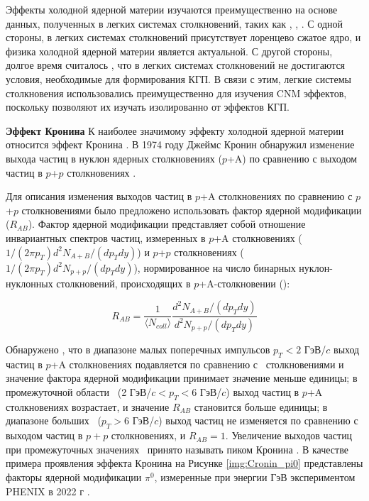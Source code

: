 Эффекты холодной ядерной материи изучаются преимущественно на основе данных, полученных в легких системах столкновений, таких как \pal, \dau, \heau. 
С одной стороны, в легких системах столкновений присутствует лоренцево сжатое ядро, и физика холодной ядерной материи является актуальной. С другой стороны, долгое время считалось \cite{PHENIX_Nature}, что в легких системах столкновений не достигаются условия, необходимые для формирования КГП. В связи с этим, легкие системы столкновения использовались преимущественно для изучения CNM эффектов, поскольку позволяют их изучать изолированно от эффектов КГП. 

\textbf{Эффект Кронина}
К наиболее значимому эффекту холодной ядерной материи относится эффект Кронина \cite{Cronin, Cronin_hadrons_pp_dAu_AuAu, Cronin2}. 
В 1974 году Джеймс Кронин обнаружил изменение выхода частиц в нуклон ядерных столкновениях ($p$+A) по сравнению с выходом частиц в $p$+$p$ столкновениях \cite{Cronin}. 

Для описания изменения выходов частиц в $p$+A столкновениях по сравнению с $p$+$p$ столкновениями было предложено использовать фактор ядерной модификации ($R_{AB}$). Фактор ядерной модификации представляет собой отношение инвариантных спектров частиц, измеренных в $p$+A столкновениях ($1/(2\pi p_T) d^2N_{A+B}/(dp_T dy)$) и $p$+$p$ столкновениях ($1/(2\pi p_T) d^2N_{p+p}/(dp_T dy)$), нормированное на число бинарных нуклон-нуклонных столкновений, происходящих в $p$+A-столкновении (\Ncoll):

$$ R_{AB} = \frac{1}{\langle N_{coll} \rangle} \frac{d^2N_{A+B}/(dp_T dy)}{d^2N_{p+p}/(dp_T dy)}$$

Обнаружено \cite{Cronin, Cronin_hadrons_pp_dAu_AuAu, pi0_smallSysts}, что в диапазоне малых поперечных импульсов $p_T < 2$ ГэВ/$c$ выход частиц в $p$+A столкновениях подавляется по сравнению с \pp \ столкновениями и значение фактора ядерной модификации принимает значение меньше единицы; в промежуточной области \pt \ (2 ГэВ/$c < p_T < 6 $ ГэВ/$c$) выход частиц в $p$+A столкновениях возрастает, и значение $R_{AB}$ становится больше единицы; в диапазоне больших \pt \ ($p_T > 6 $ ГэВ/$c$) выход частиц не изменяется по сравнению с выходом частиц в $p+p$ столкновениях, и $R_{AB}=1$. Увеличение выходов частиц при промежуточных значениях \pt \ принято называть пиком Кронина \cite{pi0_smallSysts}. 
В качестве примера проявления эффекта Кронина на Рисунке \ref{img:Cronin_pi0} представлены факторы ядерной модификации $\pi^0$, измеренные при энергии  ГэВ экспериментом PHENIX в 2022 г \cite{pi0_smallSysts}. 

